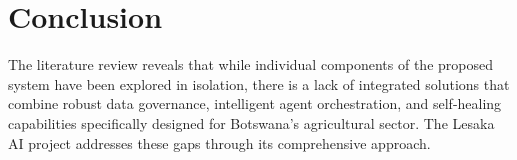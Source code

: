 \section{Conclusion}

The literature review reveals that while individual components of the proposed system have been explored in isolation, there is a lack of integrated solutions that combine robust data governance, intelligent agent orchestration, and self-healing capabilities specifically designed for Botswana's agricultural sector. The Lesaka AI project addresses these gaps through its comprehensive approach.



